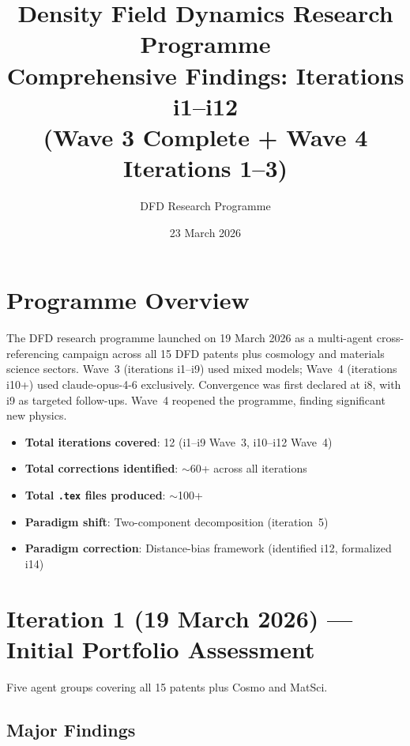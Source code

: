 \documentclass[11pt,a4paper]{article}
\title{Density Field Dynamics Research Programme\\
\Large Comprehensive Findings: Iterations i1--i12\\
\large (Wave 3 Complete + Wave 4 Iterations 1--3)}
\author{DFD Research Programme}
\date{23 March 2026}
\begin{document}
\maketitle
\tableofcontents
\newpage

\section{Programme Overview}

The DFD research programme launched on 19 March 2026 as a multi-agent
cross-referencing campaign across all 15 DFD patents plus cosmology and
materials science sectors.  Wave~3 (iterations i1--i9) used mixed models;
Wave~4 (iterations i10+) used claude-opus-4-6 exclusively.  Convergence
was first declared at i8, with i9 as targeted follow-ups.  Wave~4
reopened the programme, finding significant new physics.

\begin{itemize}[nosep]
\item \textbf{Total iterations covered}: 12 (i1--i9 Wave~3, i10--i12 Wave~4)
\item \textbf{Total corrections identified}: $\sim$60+ across all iterations
\item \textbf{Total \texttt{.tex} files produced}: $\sim$100+
\item \textbf{Paradigm shift}: Two-component decomposition (iteration~5)
\item \textbf{Paradigm correction}: Distance-bias framework (identified i12, formalized i14)
\end{itemize}


\section{Iteration 1 (19 March 2026) --- Initial Portfolio Assessment}

Five agent groups covering all 15 patents plus Cosmo and MatSci.

\subsection{Major Findings}
\end{document}
